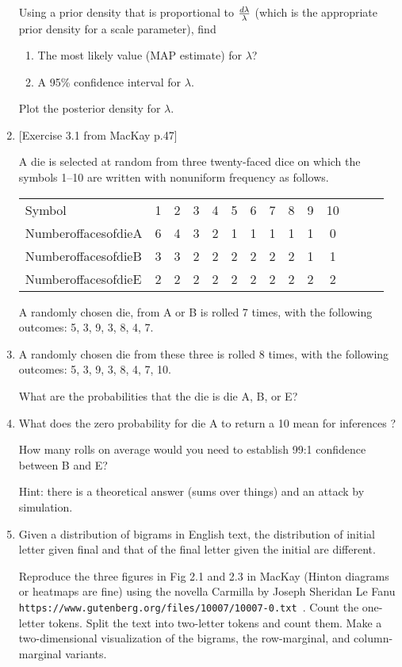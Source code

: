 \documentclass[12pt]{book}
\theoremstyle{definition}
\begin{document}
\begin{enumerate}
Using a prior density that is proportional to ${d\lambda }\over {\lambda}$ (which is the appropriate prior density for a scale parameter), find 
\begin{enumerate}
\item	The most likely value (MAP estimate) for $\lambda$? 
\item   A 95\% confidence interval for $\lambda$.
\end{enumerate}
 
Plot the posterior density for $\lambda$.

\item\label{toscientific}
[Exercise 3.1 from MacKay p.47] 

A die is selected at random from three twenty-faced dice on which the symbols 1–10 are written with nonuniform frequency as follows.

\begin{tabular} {l c c c c c c c c c c c c c }
Symbol& 1& 2 &3 &4 &5 &6 &7 &8 &9 &10 \\
NumberoffacesofdieA& 6& 4 &3 &2 &1 &1 &1 &1 &1 &0  \\
NumberoffacesofdieB& 3 &3 &2 &2 &2 &2 &2 &2 &1 &1 \\
NumberoffacesofdieE& 2 &2 &2 &2 &2 &2 &2& 2& 2& 2 \\
\end{tabular}

A randomly chosen die, from A or B is rolled 7 times, with the following outcomes: 5, 3, 9, 3, 8, 4, 7.

\item 
A randomly chosen die from these three is rolled 8 times, with the following outcomes: 5, 3, 9, 3, 8, 4, 7, 10. 

What are the probabilities that the die is die A, B, or E?

\item\label{convert}

What does the zero probability for die A to return a 10 mean for inferences ? 

How many rolls on average would you need to establish 99:1 confidence between B and E? 

Hint: there is a theoretical answer (sums over things) and an attack by simulation.

\item
Given a distribution of bigrams in English text, the distribution of initial letter given final and that of the final letter given the initial are different.  

Reproduce the three figures in Fig 2.1 and 2.3 in MacKay  (Hinton diagrams or heatmaps are fine) using the novella Carmilla by Joseph Sheridan Le Fanu
 \texttt{https://www.gutenberg.org/files/10007/10007-0.txt }.   Count the one-letter tokens.  Split the text into two-letter tokens and count them.  Make a two-dimensional visualization of the bigrams, the row-marginal, and column-marginal variants. 

\end{enumerate}
\end{document}
